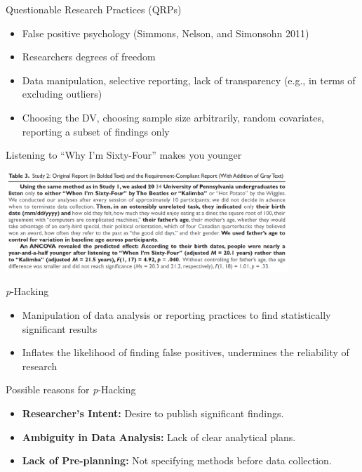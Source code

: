 \documentclass[
  ignorenonframetext,
  aspectratio=169,
]{beamer}
\providecommand{\tightlist}{%
  \setlength{\itemsep}{0pt}\setlength{\parskip}{0pt}}\usepackage{longtable,booktabs,array}
\begin{document}
\begin{frame}{Questionable Research Practices (QRPs)}
\label{questionable-research-practices-qrps}
\begin{itemize}[<+->]
\tightlist
\item
  False positive psychology (Simmons, Nelson, and Simonsohn 2011)
\item
  Researchers degrees of freedom
\item
  Data manipulation, selective reporting, lack of transparency (e.g., in
  terms of excluding outliers)
\item
  Choosing the DV, choosing sample size arbitrarily, random covariates,
  reporting a subset of findings only
\end{itemize}
\end{frame}

\begin{frame}{Listening to ``Why I'm Sixty-Four'' makes you younger}
\label{listening-to-why-im-sixty-four-makes-you-younger}
\begin{center}
\includegraphics[width=0.8\textwidth,height=\textheight]{figs/p-Hacking.png}
\end{center}
\end{frame}

\begin{frame}{\emph{p}-Hacking}
\label{p-hacking}
\begin{itemize}[<+->]
\tightlist
\item
  Manipulation of data analysis or reporting practices to find
  statistically significant results
\item
  Inflates the likelihood of finding false positives, undermines the
  reliability of research
\end{itemize}
\end{frame}

\begin{frame}{Possible reasons for \emph{p}-Hacking}
\label{possible-reasons-for-p-hacking}
\begin{itemize}[<+->]
\tightlist
\item
  \textbf{Researcher's Intent:} Desire to publish significant findings.
\item
  \textbf{Ambiguity in Data Analysis:} Lack of clear analytical plans.
\item
  \textbf{Lack of Pre-planning:} Not specifying methods before data
  collection.
\end{itemize}
\end{frame}
\end{document}
